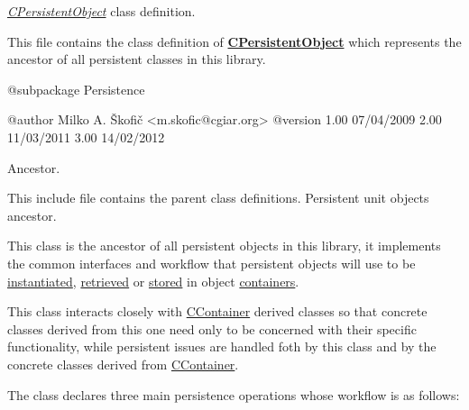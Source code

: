 {\itshape \hyperlink{class_c_persistent_object}{C\-Persistent\-Object}} class definition.

This file contains the class definition of {\bfseries \hyperlink{class_c_persistent_object}{C\-Persistent\-Object}} which represents the ancestor of all persistent classes in this library.

\begin{DoxyVerb}    @subpackage     Persistence

    @author         Milko A. Škofič <m.skofic@cgiar.org>
    @version        1.00 07/04/2009
                            2.00 11/03/2011
                            3.00 14/02/2012\end{DoxyVerb}


Ancestor.

This include file contains the parent class definitions. Persistent unit objects ancestor.

This class is the ancestor of all persistent objects in this library, it implements the common interfaces and workflow that persistent objects will use to be \hyperlink{}{instantiated}, \hyperlink{}{retrieved} or \hyperlink{}{stored} in object \hyperlink{class_c_container}{containers}.

This class interacts closely with \hyperlink{class_c_container}{C\-Container} derived classes so that concrete classes derived from this one need only to be concerned with their specific functionality, while persistent issues are handled foth by this class and by the concrete classes derived from \hyperlink{class_c_container}{C\-Container}.

The class declares three main persistence operations whose workflow is as follows\-:


